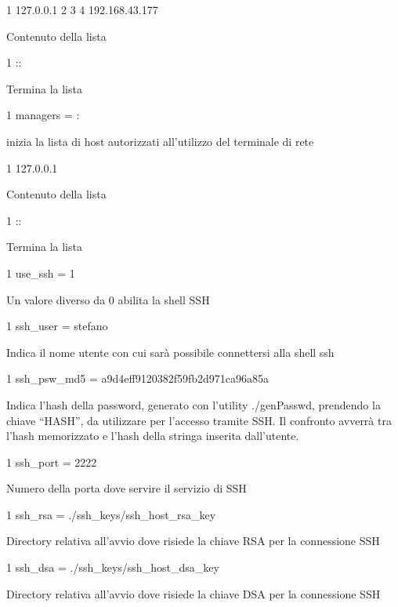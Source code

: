 \begin{DoxyCode}
1 127.0.0.1
2 
3 
4 192.168.43.177
\end{DoxyCode}
 Contenuto della lista 
\begin{DoxyCode}
1 ::
\end{DoxyCode}
 Termina la lista 
\begin{DoxyCode}
1 managers = :
\end{DoxyCode}
 inizia la lista di host autorizzati all’utilizzo del terminale di rete 
\begin{DoxyCode}
1 127.0.0.1
\end{DoxyCode}
 Contenuto della lista 
\begin{DoxyCode}
1 ::
\end{DoxyCode}
 Termina la lista 
\begin{DoxyCode}
1 use\_ssh = 1
\end{DoxyCode}
 Un valore diverso da 0 abilita la shell S\+SH 
\begin{DoxyCode}
1 ssh\_user = stefano
\end{DoxyCode}
 Indica il nome utente con cui sarà possibile connettersi alla shell ssh 
\begin{DoxyCode}
1 ssh\_psw\_md5 = a9d4eff9120382f59fb2d971ca96a85a
\end{DoxyCode}
 Indica l’hash della password, generato con l’utility ./gen\+Passwd, prendendo la chiave “\+H\+A\+S\+H”, da utilizzare per l’accesso tramite S\+SH. Il confronto avverrà tra l’hash memorizzato e l’hash della stringa inserita dall’utente. 
\begin{DoxyCode}
1 ssh\_port = 2222
\end{DoxyCode}
 Numero della porta dove servire il servizio di S\+SH 
\begin{DoxyCode}
1 ssh\_rsa = ./ssh\_keys/ssh\_host\_rsa\_key
\end{DoxyCode}


Directory relativa all’avvio dove risiede la chiave R\+SA per la connessione S\+SH 
\begin{DoxyCode}
1 ssh\_dsa = ./ssh\_keys/ssh\_host\_dsa\_key
\end{DoxyCode}
 Directory relativa all’avvio dove risiede la chiave D\+SA per la connessione S\+SH


